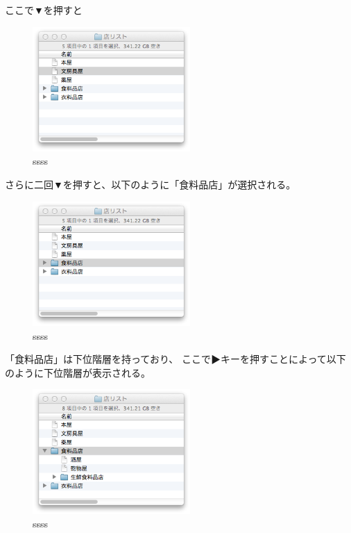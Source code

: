 \documentclass[twoside]{wiss}
\def\▼{▼}
\begin{document}
ここで{\▼}を押すと

\begin{figure}[H]
\centerline{\includegraphics[width=60mm,bb=0 0 344 272]{figures/f43016d1b524baf414f2c32c48fe9588.png}}
\caption{ssss}
\label{screenshot}
\end{figure}

さらに二回{\▼}を押すと、以下のように「食料品店」が選択される。

\begin{figure}[H]
\centerline{\includegraphics[width=60mm,bb=0 0 344 272]{figures/c074cd6daec3da0341125d1492b8a09c.png}}
\caption{ssss}
\label{screenshot}
\end{figure}

「食料品店」は下位階層を持っており、
ここで▶キーを押すことによって以下のように下位階層が表示される。

\begin{figure}[H]
\centerline{\includegraphics[width=60mm,bb=0 0 344 272]{figures/51d867d4721f65c18e84172c8818e137.png}}
\caption{ssss}
\label{screenshot}
\end{figure}
\end{document}

